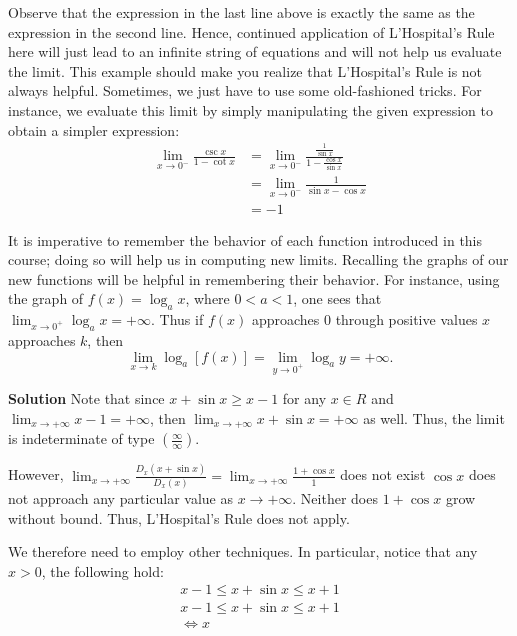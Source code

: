 \documentclass[
  letterpaper,
  DIV=11,
  numbers=noendperiod]{scrartcl}
\begin{document}
Observe that the expression in the last line above is exactly the same
as the expression in the second line. Hence, continued application of
L'Hospital's Rule here will just lead to an infinite string of equations
and will not help us evaluate the limit. This example should make you
realize that L'Hospital's Rule is not always helpful. Sometimes, we just
have to use some old-fashioned tricks. For instance, we evaluate this
limit by simply manipulating the given expression to obtain a simpler
expression: \[
\begin{aligned}
\displaystyle\lim_{x \to 0^-}\frac{\csc x}{1-\cot x}&=\displaystyle\lim_{x \to 0^-}\frac{\frac{1}{\sin x}}{1-\frac{\cos x}{\sin x}}\\&=\displaystyle\lim_{x \to 0^-}\frac{1}{\sin x-\cos x}\\&=-1
\end{aligned}
\]

It is imperative to remember the behavior of each function introduced in
this course; doing so will help us in computing new limits. Recalling
the graphs of our new functions will be helpful in remembering their
behavior. For instance, using the graph of \(f(x)=\log_a x\), where
\(0\lt a \lt 1\), one sees that
\(\displaystyle\lim_{x \to 0^+}\log_a x=+\infty\). Thus if \(f(x)\)
approaches \(0\) through positive values \(x\) approaches \(k\), then \[
\displaystyle\lim_{x \to k}\log_a[f(x)]=\displaystyle\lim_{y \to 0^+}\log_a y=+\infty.
\]

\leavevmode{}%
\textbf{Solution} Note that since \(x+\sin x \ge x - 1\) for any
\(x \in R\) and \(\displaystyle\lim_{x \to +\infty} {x-1=+\infty}\),
then \(\displaystyle\lim_{x \to +\infty}{x + \sin x = +\infty}\) as
well. Thus, the limit is indeterminate of type
\(\left(\frac{\infty}{\infty}\right)\).

However,
\(\displaystyle\lim_{x \to +\infty}{\frac{D_x(x+\sin x)}{D_x(x)}=\displaystyle\lim_{x \to +\infty}\frac{1+\cos x}{1}}\)
does not exist \(\cos x\) does not approach any particular value as
\(x\to +\infty\). Neither does \(1+\cos x\) grow without bound. Thus,
L'Hospital's Rule does not apply.

We therefore need to employ other techniques. In particular, notice that
any \(x\gt 0\), the following hold: \[
\begin{aligned}
x-1 \le x+\sin x \le x+1 \\
x-1 \le x+\sin x \le x+1\\
\iff x
\end{aligned}
\]
\end{document}

